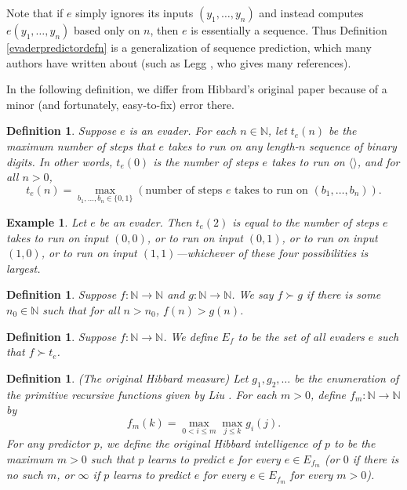 \documentclass{article}
\newtheorem{definition}[theorem]{Definition}
\newtheorem{example}[theorem]{Example}
\begin{document}
Note that if $e$ simply ignores its inputs $(y_1,\ldots,y_n)$ and instead
computes $e(y_1,\ldots,y_n)$ based only on $n$, then $e$ is essentially a sequence.
Thus Definition \ref{evaderpredictordefn} is a generalization of sequence prediction,
which many authors have written about (such as Legg \cite{legg2006there}, who gives many
references).

In the following definition, we differ from Hibbard's original paper
because of a minor (and fortunately, easy-to-fix) error there.

\begin{definition}
\label{tsubedefinition}
    Suppose $e$ is an evader.
    For each $n\in\mathbb N$, let $t_e(n)$ be the maximum number of steps that $e$ takes
    to run on any length-$n$ sequence of binary digits.
    In other words, $t_e(0)$ is the number of steps $e$ takes to run on $\langle\rangle$,
    and for all $n>0$,
    \[
        t_e(n) = \max_{b_1,\ldots,b_n\in \{0,1\}}
        (\text{number of steps $e$ takes to run on $(b_1,\ldots,b_n)$}).
    \]
\end{definition}

\begin{example}
    Let $e$ be an evader. Then
    $t_e(2)$ is equal to the number of steps $e$ takes to run on input
    $(0,0)$, or to run on input $(0,1)$, or to run on input $(1,0)$, or to run on input
    $(1,1)$---whichever of these four possibilities is largest.
\end{example}

\begin{definition}
\label{functionsuccdefn}
    Suppose $f:\mathbb N\to\mathbb N$ and $g:\mathbb N\to\mathbb N$.
    We say $f\succ g$ if there is some $n_0\in \mathbb N$ such that for all
    $n>n_0$, $f(n)>g(n)$.
\end{definition}

\begin{definition}
\label{evadersetdefinition}
    Suppose $f:\mathbb N\to\mathbb N$. We define
    $E_f$ to be the set of all evaders $e$ such that
    $f\succ t_e$.
\end{definition}

\begin{definition}
\label{classichibbardmeasuredefn}
    (The original Hibbard measure)
    Let $g_1,g_2,\ldots$ be the enumeration of the primitive recursive
    functions given by Liu \cite{liu1960enumeration}.
    For each $m>0$, define $f_m:\mathbb N\to\mathbb N$ by
    \[f_m(k)=\max_{0<i\leq m}\max_{j\leq k}g_i(j).\]
    For any predictor $p$, we define the \emph{original Hibbard intelligence of $p$}
    to be the maximum $m>0$
    such that $p$ learns to predict $e$ for every $e\in E_{f_m}$
    (or $0$ if there is no such $m$, or $\infty$ if $p$ learns to predict $e$
    for every $e\in E_{f_m}$ for every $m>0$).
\end{definition}
\end{document}
